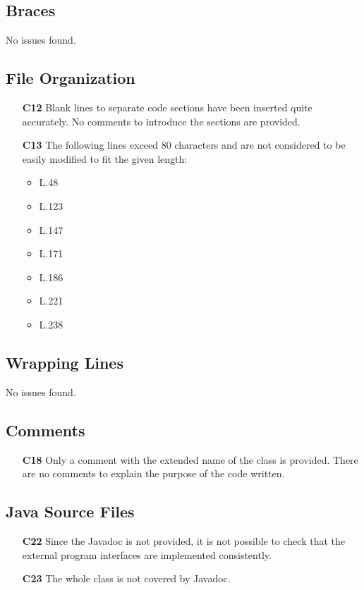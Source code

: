 \subsection{Braces}
No issues found.

\subsection{File Organization}
	\begin{itemize}
		\item[\textbf{C12}] Blank lines to separate code sections have been inserted quite accurately. No comments to introduce the sections are provided.
		\item[\textbf{C13}] The following lines exceed 80 characters and are not considered to be easily modified to fit the given length:
		\begin{itemize}
			\item L.48
			\item L.123
			\item L.147
			\item L.171
			\item L.186
			\item L.221
			\item L.238
		\end{itemize}
	\end{itemize}

\subsection{Wrapping Lines}
No issues found.

\subsection{Comments}
	\begin{itemize}
		\item[\textbf{C18}] Only a comment with the extended name of the class is provided. There are no comments to explain the purpose of the code written.
	\end{itemize}

\subsection{Java Source Files}
	\begin{itemize}
		\item[\textbf{C22}] Since the Javadoc is not provided, it is not possible to check that the external program interfaces are implemented consistently.
		\item[\textbf{C23}] The whole class is not covered by Javadoc.
	\end{itemize}

